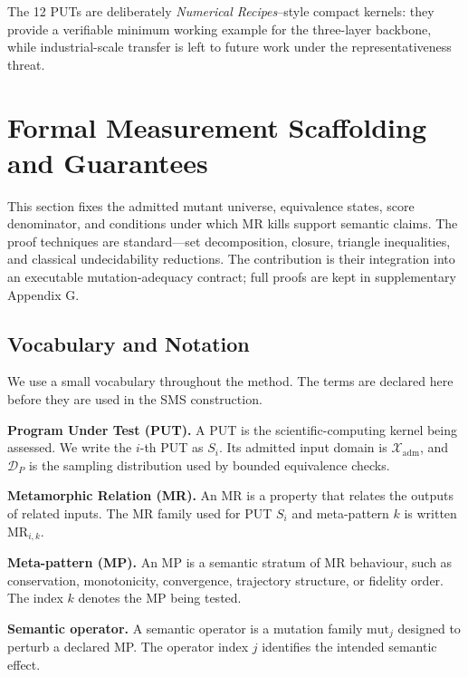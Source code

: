 \documentclass[review,12pt,authoryear]{elsarticle}
\begin{document}
The 12 PUTs are deliberately \emph{Numerical Recipes}--style compact
kernels: they provide a verifiable minimum working example for the
three-layer backbone, while industrial-scale transfer is left to future
work under the representativeness threat.


\section{Formal Measurement Scaffolding and Guarantees}
\label{formal-measurement-scaffolding}
\label{notation-and-equivalence-judgement}

This section fixes the admitted mutant universe, equivalence states,
score denominator, and conditions under which MR kills support semantic
claims. The proof
techniques are standard---set decomposition, closure, triangle
inequalities, and classical undecidability reductions. The contribution
is their integration into an executable mutation-adequacy contract;
full proofs are kept in supplementary Appendix G.

\subsection{Vocabulary and Notation}\label{vocabulary-inheritance}

We use a small vocabulary throughout the method. The terms are declared
here before they are used in the SMS construction.

\textbf{Program Under Test (PUT).} A PUT is the scientific-computing
kernel being assessed. We write the \(i\)-th PUT as \(S_i\).
Its admitted input domain is \(\mathcal{X}_{\mathrm{adm}}\), and
\(\mathcal{D}_P\) is the sampling distribution used by bounded
equivalence checks.

\textbf{Metamorphic Relation (MR).} An MR is a property that relates the
outputs of related inputs. The MR family used for PUT \(S_i\) and
meta-pattern \(k\) is written \(\mathrm{MR}_{i,k}\).

\textbf{Meta-pattern (MP).} An MP is a semantic stratum of MR behaviour,
such as conservation, monotonicity, convergence, trajectory structure, or
fidelity order. The index \(k\) denotes the MP being tested.

\textbf{Semantic operator.} A semantic operator is a mutation family
\(\mathrm{mut}_j\) designed to perturb a declared MP. The operator index
\(j\) identifies the intended semantic effect.
\end{document}
